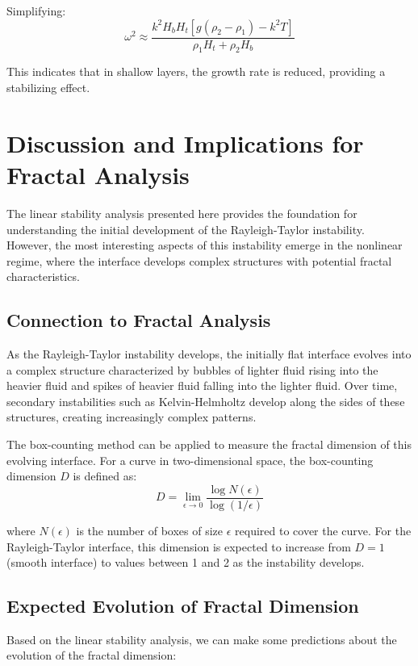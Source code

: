 \documentclass[12pt,a4paper]{article}
\begin{document}
Simplifying:
\begin{equation}
\omega^2 \approx \frac{k^2H_bH_t[g(\rho_2 - \rho_1) - k^2T]}{\rho_1H_t + \rho_2H_b}
\end{equation}

This indicates that in shallow layers, the growth rate is reduced, providing a stabilizing effect.

\section{Discussion and Implications for Fractal Analysis}
The linear stability analysis presented here provides the foundation for understanding the initial development of the Rayleigh-Taylor instability. However, the most interesting aspects of this instability emerge in the nonlinear regime, where the interface develops complex structures with potential fractal characteristics.

\subsection{Connection to Fractal Analysis}
As the Rayleigh-Taylor instability develops, the initially flat interface evolves into a complex structure characterized by bubbles of lighter fluid rising into the heavier fluid and spikes of heavier fluid falling into the lighter fluid. Over time, secondary instabilities such as Kelvin-Helmholtz develop along the sides of these structures, creating increasingly complex patterns.

The box-counting method can be applied to measure the fractal dimension of this evolving interface. For a curve in two-dimensional space, the box-counting dimension $D$ is defined as:
\begin{equation}
D = \lim_{\epsilon \to 0} \frac{\log N(\epsilon)}{\log(1/\epsilon)}
\end{equation}

where $N(\epsilon)$ is the number of boxes of size $\epsilon$ required to cover the curve. For the Rayleigh-Taylor interface, this dimension is expected to increase from $D = 1$ (smooth interface) to values between 1 and 2 as the instability develops.

\subsection{Expected Evolution of Fractal Dimension}
Based on the linear stability analysis, we can make some predictions about the evolution of the fractal dimension:
\end{document}
